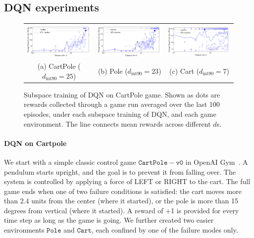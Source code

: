 \documentclass{article} %
\newcommand{\dintn}{d_{\mathrm{int90}}}
\begin{document}
\subsection{DQN experiments}
%
%
\begin{figure}[h!] \centering
	\begin{tabular}{ccc}
		\hspace{-5mm}
		\includegraphics[width=5.0cm]{dqn_cp/CP_v0_reward.pdf}
		&
		\hspace{-6mm}
		\includegraphics[width=5.0cm]{dqn_cp/CP_v2_reward.pdf}
		&
		\hspace{-6mm}
		\includegraphics[width=5.0cm]{dqn_cp/CP_v3_reward.pdf}
		\\          
		(a) CartPole  ($\dintn = 25$)&	
		(b) Pole ($\dintn = 23$)&	
		(c) Cart ($\dintn = 7$)
	\end{tabular} \vspace{-2mm}
	\caption{Subspace training of DQN on CartPole game. Shown as dots are rewards collected through a game run averaged over the last 100 episodes, 	under each subspace training of DQN, and each game environment. The line connects mean rewards across different $d$s.}
	\label{fig:dqn_cartpole}
	\vspace{-0mm}
\end{figure}


\paragraph{DQN on Cartpole} We start with a simple classic control game $\mathtt{CartPole\!-\!v0}$ in OpenAI Gym~\citep{openai_gym}. A pendulum starts upright, and the goal is to prevent it from falling over. The system is controlled by applying a force of LEFT or RIGHT to the cart. 
The full game ends when one of two failure conditions is satisfied: the cart moves more than 2.4 units from the center (where it started), or the pole is more than 15 degrees from vertical (where it started).
A reward of +1 is provided for every time step as long as the game is going. 
We further created two easier environments $\mathtt{Pole}$ and $\mathtt{Cart}$, each confined by one of the failure modes only.
\end{document}

